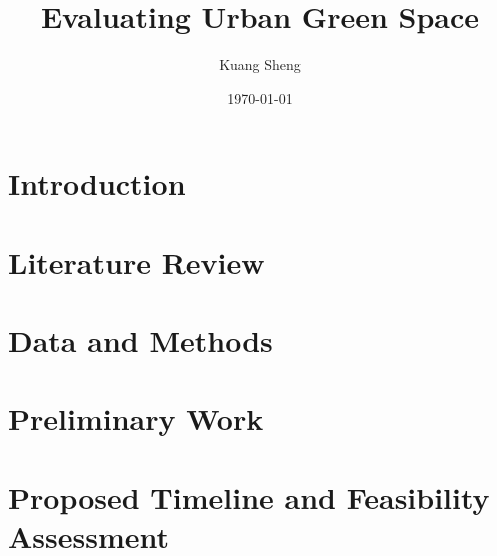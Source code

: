 \documentclass{article}
\title{Evaluating Urban Green Space}
\author{Kuang Sheng}
\date{\today}
\begin{document}
\maketitle

\section{Introduction}


\section{Literature Review}


\section{Data and Methods}


\section{Preliminary Work}


\section{Proposed Timeline and Feasibility Assessment}


\printbibliography
\end{document}

